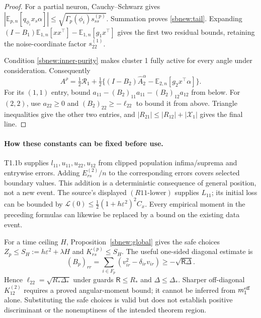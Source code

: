 \documentclass{article} %
\theoremstyle{plain}
\theoremstyle{definition}
\theoremstyle{remark}
\begin{document}
\begin{proof}
For a partial neuron, Cauchy--Schwarz gives
$|\mathbb E_{p,n}[q_{\phi_i}x_s\alpha]|\le
\sqrt{\Gamma_p(\phi_i)s_{ss}^{(p)}}$.
Summation proves \eqref{sbnew:tail}. Expanding
$(I-B_1)\mathbb E_{1,n}[xx^\top]-\mathbb E_{1,n}[g_1x^\top]$
gives the first two residual bounds, retaining the noise-coordinate
factor $s_{22}^{(1)}$.

Condition \eqref{sbnew:inner-purity} makes cluster 1 fully active for
every angle under consideration. Consequently
\[
 A^\rho=\tfrac12\mathcal R_1+
 \tfrac12\{(I-B_2)\widehat A_2^\alpha-
              \mathbb E_{2,n}[g_2x^\top\alpha]\}.
\]
For its $(1,1)$ entry, bound
$a_{11}-(B_2)_{11}a_{11}-(B_2)_{12}a_{12}$ from below.
For $(2,2)$, use $a_{22}\ge0$ and
$(B_2)_{22}\ge-\ell_{22}$ to bound it from above.
Triangle inequalities give the other two entries, and
$|R_{21}|\le|R_{12}|+|\mathcal X_1|$ gives the final line.
\end{proof}

\paragraph{How these constants can be fixed before use.}
T1.1b supplies $l_{11},u_{11},u_{22},u_{12}$ from clipped population
infima/suprema and entrywise errors. Adding $E_{rs}^{(2)}/n$ to the
corresponding errors covers selected boundary values. This addition is a
deterministic consequence of general position, not a new event.
The source's displayed $(R11\text{-lower})$ supplies $L_{11}$; its
initial loss can be bounded by
$\mathcal L(0)\le\tfrac12(1+h\varepsilon^2)^2C_x$.
Every empirical moment in the preceding formulas can likewise be replaced
by a bound on the existing data event.

For a time ceiling $H$, Proposition~\ref{sbnew:global} gives the safe choices
$Z_p\le S_H:=h\varepsilon^2+\lambda H$ and $K_{rs}^{(p)}\le S_H$.
The useful one-sided diagonal estimate is
\begin{equation}\label{sbnew:diagonal-bulk}
 (B_p)_{rr}=\sum_{i\in F_p}(v_{ir}^2-\delta_{ir}v_{ir})
 \ge-\sqrt{\mathsf R\Delta}.
\end{equation}
Hence $\ell_{22}=\sqrt{R_*\Delta_*}$ under guards
$\mathsf R\le R_*$ and $\Delta\le\Delta_*$.
Sharper off-diagonal $K_{12}^{(2)}$ requires a proved angular-moment
bound; it cannot be inferred from $m_1^{\rm eff}$ alone.
Substituting the safe choices is valid but does not establish positive
discriminant or the nonemptiness of the intended theorem region.
\end{document}
